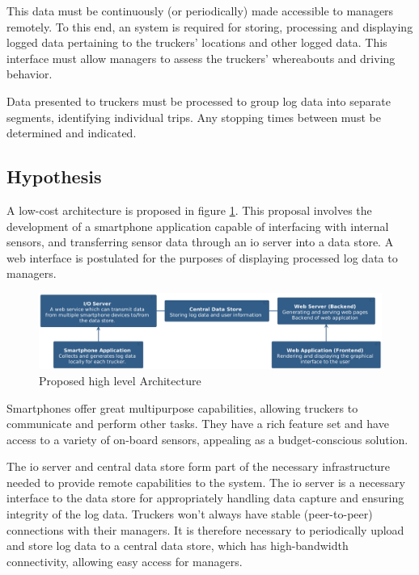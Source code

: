 This data must be continuously (or periodically) made accessible to managers remotely.
To this end, an system is required for storing, processing and displaying logged data pertaining to the truckers' locations and other logged data.
This interface must allow managers to assess the truckers' whereabouts and driving behavior.

Data presented to truckers must be processed to group log data into separate segments, identifying individual trips.
Any stopping times between must be determined and indicated.

\pagebreak
\subsection{Hypothesis}
A low-cost architecture is proposed in figure \ref{fig:hypothesis}.
This proposal involves the development of a smartphone application capable of interfacing with internal sensors, and transferring sensor data through an \ac{io} server into a data store.
A web interface is postulated for the purposes of displaying processed log data to managers.\cite{bertocco1998client}

\begin{figure}[H]
    \centering
    \includegraphics[width=6in]{../diag/hypothesis.png}
    \caption{Proposed high level Architecture}
    \label{fig:hypothesis}
\end{figure}

Smartphones offer great multipurpose capabilities, allowing truckers to communicate and perform other tasks.
They have a rich feature set and have access to a variety of on-board sensors, appealing as a budget-conscious solution.

The \ac{io} server and central data store form part of the necessary infrastructure needed to provide remote capabilities to the system.
The \ac{io} server is a necessary interface to the data store for appropriately handling data capture and ensuring integrity of the log data.
Truckers won't always have stable (peer-to-peer) connections with their managers.
It is therefore necessary to periodically upload and store log data to a central data store, which has high-bandwidth connectivity, allowing easy access for managers.

